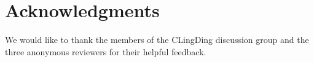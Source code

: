 \documentclass[11pt,letterpaper]{article}
\begin{document}






\section*{Acknowledgments}

We would like to thank the members of the CLingDing discussion group and the three anonymous reviewers for their helpful feedback.

{\fontsize{10}{1em}
\selectfont


}

\end{document}
